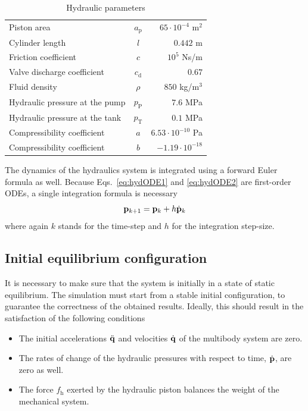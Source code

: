 \documentclass[fleqn,11pt]{article}
\renewcommand{\arraystretch}{1.136}
\newcommand{\vel}		{ {{\dot{\bf{q}}}} }
\newcommand{\acc}		{ {\ddot{\bf{q}}} }
\newcommand{\pres}		{ {\bf{p}} }
\newcommand{\presd}		{ {\dot{\bf{p}}} }
\begin{document}
\begin{table}[ht]
\begin{center}
{
	\renewcommand{\arraystretch}{1.25}
	\begin{tabular}{lcr}
		\hline
		Piston area                        & $a_\text{p}$      & $65 \cdot 10^{-4}$ m$^2$       \\
		Cylinder length                    & $l$               & $0.442$ m                      \\
		Friction coefficient               & $c$               & $10^5$ Ns/m                    \\
		Valve discharge coefficient        & $c_{\text{d}}$    & $0.67$                         \\
		Fluid density                      & $\rho$            & $850$ kg/m$^3$                 \\
		Hydraulic pressure at the pump     & $p_{\text{P}}$    & $7.6$ MPa                      \\
		Hydraulic pressure at the tank     & $p_{\text{T}}$    & $0.1$ MPa                      \\
		Compressibility coefficient        & $a$               & $6.53 \cdot 10^{-10}$ Pa       \\
		Compressibility coefficient        & $b$               & $-1.19 \cdot 10^{-18}$         \\
		\hline
	\end{tabular}
}
\end{center}
\caption{Hydraulic parameters}
\label{tab:hydrParams}
\end{table}

The dynamics of the hydraulics system is integrated using a forward Euler formula as well.
Because Eqs.~\eqref{eq:hydODE1} and \eqref{eq:hydODE2} are first-order ODEs, a single integration formula is necessary
\begin{equation}
	\pres_{k+1} = \pres_k + h\presd_k
	\label{eq:fwE}
\end{equation}
where again $k$ stands for the time-step and $h$ for the integration step-size.


\subsection{Initial equilibrium configuration}
\label{InitialEquilibrium}

It is necessary to make sure that the system is initially in a state of static equilibrium.
The simulation must start from a stable initial configuration, to guarantee the correctness of the obtained results.
Ideally, this should result in the satisfaction of the following conditions
\begin{itemize}
	\item{ The initial accelerations $\acc$ and velocities $\vel$ of the multibody system are zero.}
	\item{ The rates of change of the hydraulic pressures with respect to time, $\presd$, are zero as well.}
	\item{ The force $f_{\text{h}}$ exerted by the hydraulic piston balances the weight of the mechanical system.} 
\end{itemize}
\end{document}
